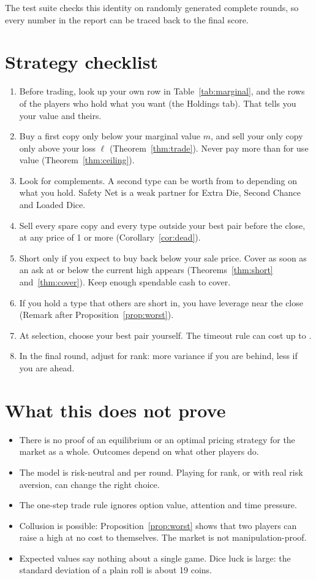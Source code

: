 \documentclass[11pt]{article}
\theoremstyle{definition}
\begin{document}
The test suite checks this identity on randomly generated complete rounds, so every number in the report can be traced back to the final score.

\section{Strategy checklist}
\begin{enumerate}
\item Before trading, look up your own row in Table~\ref{tab:marginal}, and the rows of the players who hold what you want (the Holdings tab). That tells you your value and theirs.
\item Buy a first copy only below your marginal value $m$, and sell your only copy only above your loss $\ell$ (Theorem~\ref{thm:trade}). Never pay more than \MaxMarginalAll{} for use value (Theorem~\ref{thm:ceiling}).
\item Look for complements. A second type can be worth from \MinMarginal{} to \MaxMarginal{} depending on what you hold. Safety Net is a weak partner for Extra Die, Second Chance and Loaded Dice.
\item Sell every spare copy and every type outside your best pair before the close, at any price of 1 or more (Corollary~\ref{cor:dead}).
\item Short only if you expect to buy back below your sale price. Cover as soon as an ask at or below the current high appears (Theorems~\ref{thm:short} and~\ref{thm:cover}). Keep enough spendable cash to cover.
\item If you hold a type that others are short in, you have leverage near the close (Remark after Proposition~\ref{prop:worst}).
\item At selection, choose your best pair yourself. The timeout rule can cost up to \MaxFallbackLoss{}.
\item In the final round, adjust for rank: more variance if you are behind, less if you are ahead.
\end{enumerate}

\section{What this does not prove}
\begin{itemize}
\item There is no proof of an equilibrium or an optimal pricing strategy for the market as a whole. Outcomes depend on what other players do.
\item The model is risk-neutral and per round. Playing for rank, or with real risk aversion, can change the right choice.
\item The one-step trade rule ignores option value, attention and time pressure.
\item Collusion is possible: Proposition~\ref{prop:worst} shows that two players can raise a high at no cost to themselves. The market is not manipulation-proof.
\item Expected values say nothing about a single game. Dice luck is large: the standard deviation of a plain roll is about 19 coins.
\end{itemize}
\end{document}
